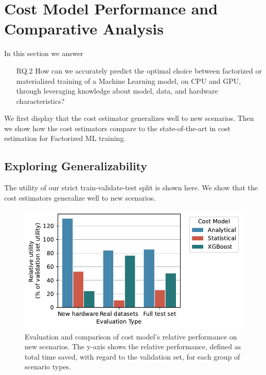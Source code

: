 
\section{Cost Model Performance and Comparative Analysis}
\label{sec:eval-model-evaluation}

In this section we answer
\begin{itemize}
  \item[RQ.2] How can we accurately predict the optimal choice between factorized or materialized training of a Machine Learning model, on CPU and GPU, through leveraging knowledge about model, data, and hardware characteristics?
\end{itemize}

We first display that the cost estimator generalizes well to new scenarios. Then we show how the cost estimators compare to the state-of-the-art in cost estimation for Factorized ML training.

\subsection{Exploring Generalizability}
The utility of our strict train-validate-test split is shown here. We show that the cost estimators generalize well to new scenarios.

\begin{figure}
  \centering
  \includegraphics[width=0.6\linewidth]{chapters/06_evaluation/figures/eval_generalization.pdf}
  \caption{Evaluation and comparison of cost model's relative performance on new scenarios. The y-axis shows the relative performance, defined as total time saved, with regard to the validation set, for each group of scenario types.}
  \label{fig:6-generalization}
\end{figure}

